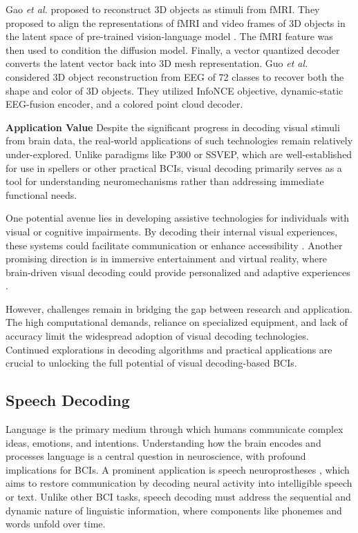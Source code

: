 \documentclass[journal]{IEEEtran}
\begin{document}
Gao \emph{et al.} \cite{Gao2024, Gao2024a} proposed to reconstruct 3D objects as stimuli from fMRI. They proposed to align the representations of fMRI and video frames of 3D objects in the latent space of pre-trained vision-language model \cite{Radford2021}. The fMRI feature was then used to condition the diffusion model. Finally, a vector quantized decoder converts the latent vector back into 3D mesh representation. Guo \emph{et al.} \cite{Guo2024} considered 3D object reconstruction from EEG of 72 classes to recover both the shape and color of 3D objects. They utilized InfoNCE objective, dynamic-static EEG-fusion encoder, and a colored point cloud decoder.

\textbf{Application Value} Despite the significant progress in decoding visual stimuli from brain data, the real-world applications of such technologies remain relatively under-explored. Unlike paradigms like P300 or SSVEP, which are well-established for use in spellers or other practical BCIs, visual decoding primarily serves as a tool for understanding neuromechanisms rather than addressing immediate functional needs.

One potential avenue lies in developing assistive technologies for individuals with visual or cognitive impairments. By decoding their internal visual experiences, these systems could facilitate communication or enhance accessibility \cite{Beauchamp2020}. Another promising direction is in immersive entertainment and virtual reality, where brain-driven visual decoding could provide personalized and adaptive experiences \cite{Ferrante2024}.

However, challenges remain in bridging the gap between research and application. The high computational demands, reliance on specialized equipment, and lack of accuracy limit the widespread adoption of visual decoding technologies. Continued explorations in decoding algorithms and practical applications are crucial to unlocking the full potential of visual decoding-based BCIs.

\subsection{Speech Decoding} \label{sect:language}

Language is the primary medium through which humans communicate complex ideas, emotions, and intentions. Understanding how the brain encodes and processes language is a central question in neuroscience, with profound implications for BCIs. A prominent application is speech neuroprostheses \cite{Chang2024}, which aims to restore communication by decoding neural activity into intelligible speech or text. Unlike other BCI tasks, speech decoding must address the sequential and dynamic nature of linguistic information, where components like phonemes and words unfold over time.
\end{document}
